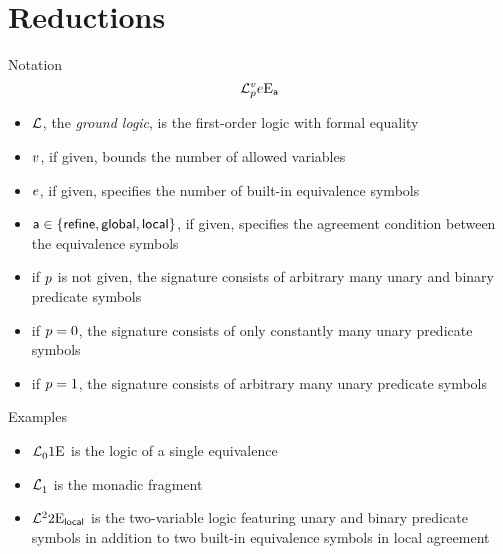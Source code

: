 \documentclass{beamer}
\begin{document}
\section{Reductions}
\begin{frame}{Notation}
\[
  \mathcal{L}^{v}_{p}{e}\mathrm{E}_{\mathsf{a}}
\]
\begin{itemize}
  \item
  $\mathcal{L}$, the \emph{ground logic}, is the first-order logic with formal equality
  
  \pause
  \item
  $v$, if given, bounds the number of allowed variables
  
  \pause
  \item
  $e$, if given, specifies the number of built-in equivalence symbols
  
  \pause
  \item
  $\mathsf{a}\in\left\{\mathsf{refine},\mathsf{global},\mathsf{local}\right\}$, if given, specifies the agreement
  condition between the equivalence symbols
  
  \pause
  \item
  if $p$ is not given, the signature consists of arbitrary many unary and
  binary predicate symbols
  
  \pause
  \item
  if $p = 0$, the signature consists of only constantly many unary predicate
  symbols
  
  \pause
  \item
  if $p = 1$, the signature consists of arbitrary many unary predicate
  symbols
\end{itemize}
\end{frame}

\begin{frame}{Examples}
\begin{itemize}
  \item
  $\mathcal{L}^{{}}_{0}{1}\mathrm{E}_{{}}$ is the logic of a single equivalence
  
  \item
  $\mathcal{L}^{{}}_{1}$ is the monadic fragment
  
  \item
  $\mathcal{L}^{2}_{{}}{2}\mathrm{E}_{\mathsf{local}}$ is the two-variable logic featuring unary and
  binary predicate symbols in addition to two built-in equivalence symbols in
  local agreement
\end{itemize}
\end{frame}
\end{document}
